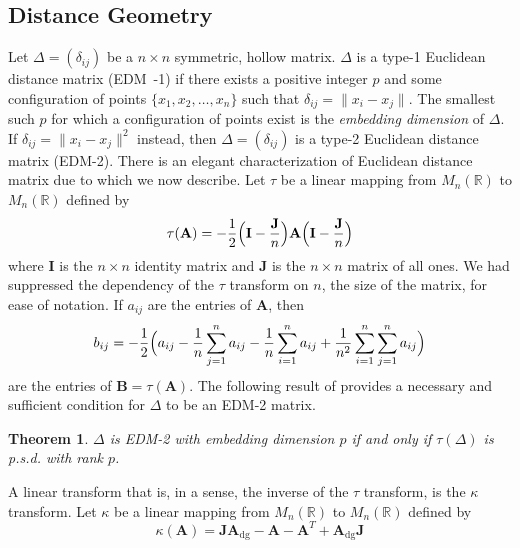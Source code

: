 \documentclass[10pt,twocolumn]{article}
\newtheorem{theorem}{Theorem}
\numberwithin{equation}{section}
\begin{document}
\subsection{Distance Geometry}
\label{sec:distance-geometry}
Let $\Delta = (\delta_{ij})$ be a $n \times n$ symmetric, hollow
matrix. $\Delta$ is a type-1 Euclidean distance matrix ({EDM~-1}) if
there exists a positive integer $p$ and some configuration of points
$\{x_1,x_2,\dots, x_n\}$ such that $\delta_{ij} = \| x_i - x_j
\|$. The smallest such $p$ for which a configuration of points exist
is the {\em embedding dimension} of $\Delta$. If $\delta_{ij} = \| x_i
- x_j\|^{2}$ instead, then $\Delta = (\delta_{ij})$ is a type-2
Euclidean distance matrix (EDM-2). There is an elegant characterization
of Euclidean distance matrix due to \cite{schoenberg38:_metric} which
we now describe. Let $\tau$ be a linear mapping from $M_n(\mathbb{R})$
to $M_n(\mathbb{R})$ defined by
\begin{equation}
  \label{eq:1}
  \tau(\mathbf{A}) = -\frac{1}{2} \Bigl(\mathbf{I} -
  \frac{\mathbf{J}}{n}\Bigr) \mathbf{A} \Bigl(\mathbf{I} -
  \frac{\mathbf{J}}{n} \Bigr)
\end{equation}
where $\mathbf{I}$ is the $n \times n$ identity matrix and
$\mathbf{J}$ is the $n \times n$ matrix of all ones.  We had
suppressed the dependency of the $\tau$ transform on $n$, the size of
the matrix, for ease of notation. If $a_{ij}$ are the entries of
$\mathbf{A}$, then
\begin{equation*}
  b_{ij} = -\frac{1}{2}\Bigl(a_{ij} - \frac{1}{n}\sum_{j=1}^{n}a_{ij} -
  \frac{1}{n}\sum_{i=1}^{n}{a_{ij}} +
  \frac{1}{n^2}\sum_{i=1}^{n}\sum_{j=1}^{n}a_{ij}\Bigr)
\end{equation*}
are the entries of $\mathbf{B} = \tau(\mathbf{A})$. The following
result of \cite{schoenberg38:_metric} provides a necessary and
sufficient condition for $\Delta$ to be an EDM-2 matrix.
\begin{theorem}
  \label{thm:1}
  $\Delta$ is EDM-2 with embedding dimension $p$ if and only
  if $\tau(\Delta)$ is p.s.d. with rank
  $p$. 
\end{theorem}
A linear transform that is, in a sense, the inverse of the $\tau$
transform, is the $\kappa$ transform. Let $\kappa$ be a linear mapping
from $M_n(\mathbb{R})$ to $M_n(\mathbb{R})$ defined by
\begin{equation}
  \label{eq:2}
  \kappa(\mathbf{A}) = \mathbf{J}\mathbf{A}_{\mathrm{dg}} -
  \mathbf{A} - \mathbf{A}^{T} + \mathbf{A}_{\mathrm{dg}}\mathbf{J}
\end{equation}
\end{document}
